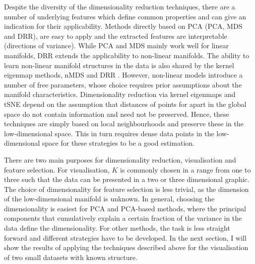 Despite the diversity of the dimensionality reduction techniques, there are a number of underlying features which define common properties and can give an indication for their applicability. Methods directly based on PCA (PCA, MDS and DRR), are easy to apply and the extracted features are interpretable (directions of variance). While PCA and MDS mainly work well for linear manifolds, DRR extends the applicability to non-linear manifolds. The ability to learn non-linear manifold structures in the data is also shared by the kernel eigenmap methods, nMDS and DRR \citep{Coifman2006}. However, non-linear models introduce a number of free parameters, whose choice requires prior assumptions about the manifold characteristics. Dimensionality reduction via kernel eigenmaps and tSNE depend on the assumption that distances of points for apart in the global space do not contain information and need not be preserved. Hence, these techniques are simply based on local neighbourhoods and preserve these in the low-dimensional space. This in turn requires dense data points in the low-dimensional space for these strategies to be a good estimation. 

There are two main purposes for dimensionality reduction, visualisation and feature selection.  For visualisation, \(K\) is commonly chosen in a range from one to three such that the data can be presented in a two or three dimensional graphic. The choice of dimensionality for feature selection is less trivial, as the dimension of the low-dimensional manifold is unknown. In general, choosing the dimensionality is easiest for PCA and PCA-based methods, where the principal components that cumulatively explain a certain fraction of the variance in the data define the dimensionality. For other methods, the task is less straight forward and different strategies have to be developed.  In the next section, I will show the results of applying the techniques described above for the visualisation of two small datasets with known structure.
